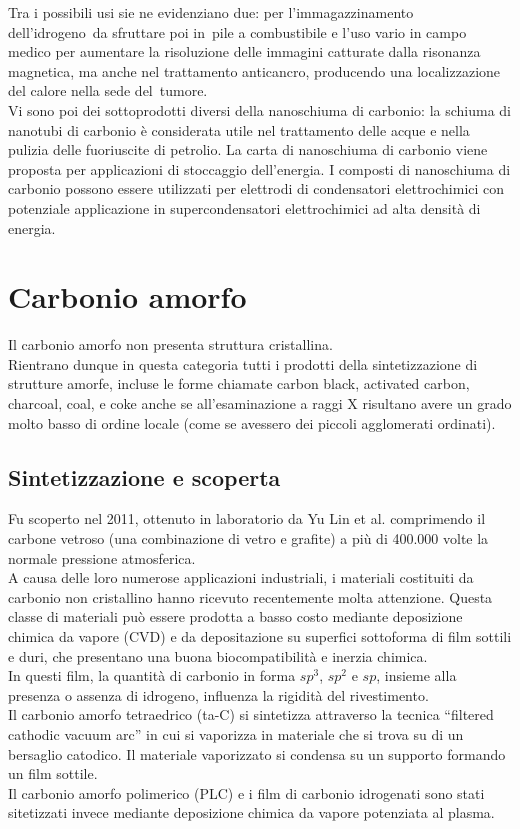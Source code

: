 \documentclass[a4paper,titlepage]{book}
\begin{document}
Tra i possibili usi sie ne evidenziano due: per l'immagazzinamento dell'idrogeno da sfruttare poi in pile a combustibile e l'uso vario in campo medico per aumentare la risoluzione delle immagini catturate dalla risonanza magnetica, ma anche nel trattamento anticancro, producendo una localizzazione del calore nella sede del tumore. \\
Vi sono poi dei sottoprodotti diversi della nanoschiuma di carbonio: la schiuma di nanotubi di carbonio è considerata utile nel trattamento delle acque e nella pulizia delle fuoriuscite di petrolio. La carta di nanoschiuma di carbonio viene proposta per applicazioni di stoccaggio dell'energia. I composti di nanoschiuma di carbonio possono essere utilizzati per elettrodi di condensatori elettrochimici con potenziale applicazione in supercondensatori elettrochimici ad alta densità di energia.
\chapter {Carbonio amorfo}
Il carbonio amorfo non presenta struttura cristallina.\\ 
Rientrano dunque in questa categoria tutti i prodotti della sintetizzazione di strutture amorfe, incluse le forme chiamate carbon black, activated carbon, charcoal, coal, e coke anche se all'esaminazione a raggi X risultano avere un grado molto basso di ordine locale (come se avessero dei piccoli agglomerati ordinati).
\section{Sintetizzazione e scoperta}
Fu scoperto nel 2011, ottenuto in laboratorio da Yu Lin et al. \cite{lin} comprimendo il carbone vetroso (una combinazione di vetro e grafite) a più di 400.000 volte la normale pressione atmosferica. \\
A causa delle loro numerose applicazioni industriali, i materiali costituiti da carbonio non cristallino hanno ricevuto recentemente molta attenzione. Questa classe di materiali può essere prodotta a basso costo mediante deposizione chimica da vapore (CVD) e da depositazione su superfici sottoforma di film sottili e duri, che presentano una buona biocompatibilità e inerzia chimica.\\
In questi film, la quantità di carbonio in forma $sp^3$, $sp^2$ e $sp$, insieme alla presenza o assenza di idrogeno, influenza la rigidità del rivestimento.\\
Il carbonio amorfo tetraedrico (ta-C) si sintetizza attraverso la tecnica “filtered cathodic vacuum arc” in cui si vaporizza in materiale che si trova su di un bersaglio catodico. Il materiale vaporizzato si condensa su un supporto formando un film sottile.\\
Il carbonio amorfo polimerico (PLC) e i film di carbonio idrogenati sono stati sitetizzati invece mediante deposizione chimica da vapore potenziata al plasma.
\end{document}
